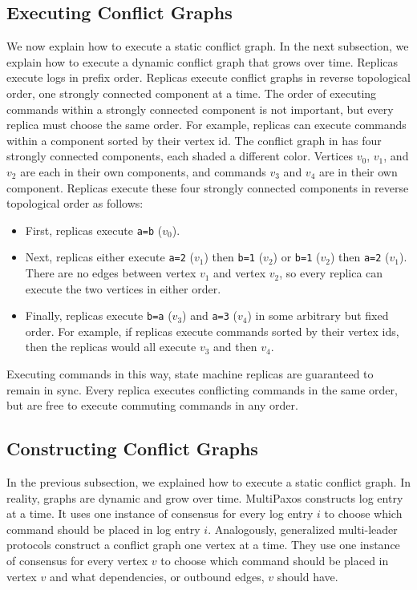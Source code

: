 \subsection{Executing Conflict Graphs}
We now explain how to execute a static conflict graph. In the next subsection,
we explain how to execute a dynamic conflict graph that grows over time.
%
Replicas execute logs in prefix order. Replicas execute conflict graphs in
reverse topological order, one strongly connected component at a time.  The
order of executing commands within a strongly connected component is not
important, but every replica must choose the same order. For example, replicas
can execute commands within a component sorted by their vertex id.
%
The conflict graph in  has four strongly connected
components, each shaded a different color. Vertices $v_0$, $v_1$, and $v_2$ are
each in their own components, and commands $v_3$ and $v_4$ are in their own
component. Replicas execute these four strongly connected components in reverse
topological order as follows:
\begin{itemize}
  \item
    First, replicas execute \texttt{a=b} ($v_0$).

  \item
    Next, replicas either execute \texttt{a=2} ($v_1$) then \texttt{b=1}
    ($v_2$) or \texttt{b=1} ($v_2$) then \texttt{a=2} ($v_1$). There are no
    edges between vertex $v_1$ and vertex $v_2$, so every replica can execute
    the two vertices in either order.

  \item
    Finally, replicas execute \texttt{b=a} ($v_3$) and \texttt{a=3} ($v_4$) in
    some arbitrary but fixed order. For example, if replicas execute commands
    sorted by their vertex ids, then the replicas would all execute $v_3$ and
    then $v_4$.
\end{itemize}
Executing commands in this way, state machine replicas are guaranteed to remain
in sync. Every replica executes conflicting commands in the same order, but are
free to execute commuting commands in any order.

\subsection{Constructing Conflict Graphs}
In the previous subsection, we explained how to execute a static conflict
graph. In reality, graphs are dynamic and grow over time. MultiPaxos constructs
%
 log entry at a time. It uses one instance of consensus for
every log entry $i$ to choose which command should be placed in log entry $i$.
Analogously, generalized multi-leader protocols construct a conflict graph one
vertex at a time. They use one instance of consensus for every vertex $v$ to
choose which command should be placed in vertex $v$ and what dependencies, or
outbound edges, $v$ should have.

